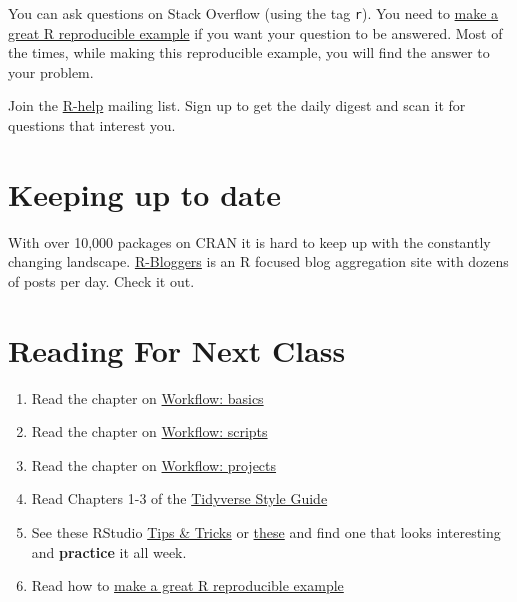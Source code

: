 \documentclass[]{book}
\providecommand{\tightlist}{%
  \setlength{\itemsep}{0pt}\setlength{\parskip}{0pt}}
\theoremstyle{definition}
\theoremstyle{definition}
\theoremstyle{definition}
\theoremstyle{remark}
\begin{document}
You can ask questions on Stack Overflow (using the tag \texttt{r}). You
need to
\href{https://stackoverflow.com/questions/5963269/how-to-make-a-great-r-reproducible-example}{make
a great R reproducible example} if you want your question to be
answered. Most of the times, while making this reproducible example, you
will find the answer to your problem.

Join the \href{https://www.r-project.org/mail.html}{R-help} mailing
list. Sign up to get the daily digest and scan it for questions that
interest you.

\hypertarget{keeping-up-to-date}{%
\section{Keeping up to date}\label{keeping-up-to-date}}

With over 10,000 packages on CRAN it is hard to keep up with the
constantly changing landscape.
\href{https://www.r-bloggers.com/}{R-Bloggers} is an R focused blog
aggregation site with dozens of posts per day. Check it out.

\hypertarget{reading-for-next-class}{%
\section{Reading For Next Class}\label{reading-for-next-class}}

\begin{enumerate}
\def\labelenumi{\arabic{enumi}.}
\tightlist
\item
  Read the chapter on
  \href{http://r4ds.had.co.nz/workflow-basics.html}{Workflow: basics}
\item
  Read the chapter on
  \href{http://r4ds.had.co.nz/workflow-scripts.html}{Workflow: scripts}
\item
  Read the chapter on
  \href{http://r4ds.had.co.nz/workflow-projects.html}{Workflow:
  projects}
\item
  Read Chapters 1-3 of the
  \href{http://style.tidyverse.org/index.html}{Tidyverse Style Guide}
\item
  See these RStudio
  \href{https://rviews.rstudio.com/categories/tips-and-tricks/}{Tips \&
  Tricks} or \href{https://twitter.com/rstudiotips}{these} and find one
  that looks interesting and \textbf{practice} it all week.
\item
  Read how to
  \href{https://stackoverflow.com/questions/5963269/how-to-make-a-great-r-reproducible-example}{make
  a great R reproducible example}
\end{enumerate}
\end{document}
